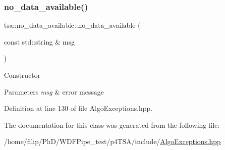 \subsubsection{\texorpdfstring{no\+\_\+data\+\_\+available()}{no\_data\_available()}}
{\footnotesize\ttfamily tsa\+::no\+\_\+data\+\_\+available\+::no\+\_\+data\+\_\+available (\begin{DoxyParamCaption}\item[{const std\+::string \&}]{msg }\end{DoxyParamCaption})\hspace{0.3cm}{\ttfamily [inline]}}

Constructor


\begin{DoxyParams}{Parameters}
{\em msg} & error message \\
\hline
\end{DoxyParams}


Definition at line 130 of file Algo\+Exceptions.\+hpp.



The documentation for this class was generated from the following file\+:\begin{DoxyCompactItemize}
\item 
/home/filip/\+Ph\+D/\+W\+D\+F\+Pipe\+\_\+test/p4\+T\+S\+A/include/\hyperlink{_algo_exceptions_8hpp}{Algo\+Exceptions.\+hpp}\end{DoxyCompactItemize}
